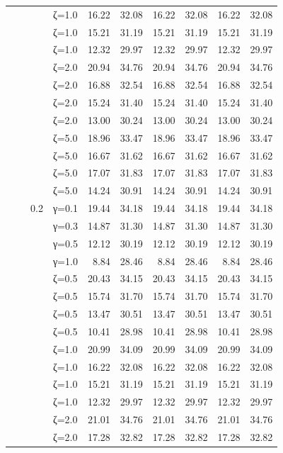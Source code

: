 \begin{table}[htbp]
\begin{tabular}{ll r l  rr  rr  rr}
  &  &  & ζ=1.0 & 16.22 & 32.08 & 16.22 & 32.08 & 16.22 & 32.08 \\
  &  &  & ζ=1.0 & 15.21 & 31.19 & 15.21 & 31.19 & 15.21 & 31.19 \\
  &  &  & ζ=1.0 & 12.32 & 29.97 & 12.32 & 29.97 & 12.32 & 29.97 \\
  &  &  & ζ=2.0 & 20.94 & 34.76 & 20.94 & 34.76 & 20.94 & 34.76 \\
  &  &  & ζ=2.0 & 16.88 & 32.54 & 16.88 & 32.54 & 16.88 & 32.54 \\
  &  &  & ζ=2.0 & 15.24 & 31.40 & 15.24 & 31.40 & 15.24 & 31.40 \\
  &  &  & ζ=2.0 & 13.00 & 30.24 & 13.00 & 30.24 & 13.00 & 30.24 \\
  &  &  & ζ=5.0 & 18.96 & 33.47 & 18.96 & 33.47 & 18.96 & 33.47 \\
  &  &  & ζ=5.0 & 16.67 & 31.62 & 16.67 & 31.62 & 16.67 & 31.62 \\
  &  &  & ζ=5.0 & 17.07 & 31.83 & 17.07 & 31.83 & 17.07 & 31.83 \\
  &  &  & ζ=5.0 & 14.24 & 30.91 & 14.24 & 30.91 & 14.24 & 30.91 \\
  &  & 0.2 & γ=0.1 & 19.44 & 34.18 & 19.44 & 34.18 & 19.44 & 34.18 \\
  &  &  & γ=0.3 & 14.87 & 31.30 & 14.87 & 31.30 & 14.87 & 31.30 \\
  &  &  & γ=0.5 & 12.12 & 30.19 & 12.12 & 30.19 & 12.12 & 30.19 \\
  &  &  & γ=1.0 & 8.84 & 28.46 & 8.84 & 28.46 & 8.84 & 28.46 \\
  &  &  & ζ=0.5 & 20.43 & 34.15 & 20.43 & 34.15 & 20.43 & 34.15 \\
  &  &  & ζ=0.5 & 15.74 & 31.70 & 15.74 & 31.70 & 15.74 & 31.70 \\
  &  &  & ζ=0.5 & 13.47 & 30.51 & 13.47 & 30.51 & 13.47 & 30.51 \\
  &  &  & ζ=0.5 & 10.41 & 28.98 & 10.41 & 28.98 & 10.41 & 28.98 \\
  &  &  & ζ=1.0 & 20.99 & 34.09 & 20.99 & 34.09 & 20.99 & 34.09 \\
  &  &  & ζ=1.0 & 16.22 & 32.08 & 16.22 & 32.08 & 16.22 & 32.08 \\
  &  &  & ζ=1.0 & 15.21 & 31.19 & 15.21 & 31.19 & 15.21 & 31.19 \\
  &  &  & ζ=1.0 & 12.32 & 29.97 & 12.32 & 29.97 & 12.32 & 29.97 \\
  &  &  & ζ=2.0 & 21.01 & 34.76 & 21.01 & 34.76 & 21.01 & 34.76 \\
  &  &  & ζ=2.0 & 17.28 & 32.82 & 17.28 & 32.82 & 17.28 & 32.82 \\

\end{tabular}
\end{table}
